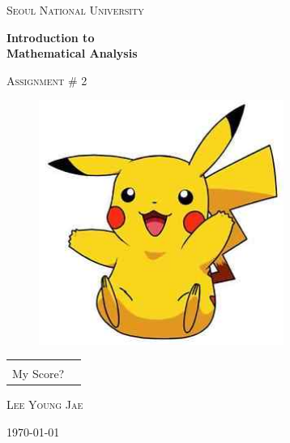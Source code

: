 \documentclass{article}
\begin{document}
\begin{titlepage}
\centering
{\scshape\LARGE Seoul National University \par}
\vspace{1.5cm}
{\huge\bfseries Introduction to\\Mathematical Analysis\par}
\vspace{1cm}
{\scshape\Large Assignment \# 2\par}

\vspace{1cm}

\begin{figure}[ht!]
\centering
\includegraphics[width=80mm]{pika.jpg}
\end{figure}

\vspace{1cm}

\arrayrulewidth=1.2pt
\begin{tabular}{p{2.5cm}p{2cm}}
\centering
& \\
\cline{2-2}
\vspace{-.73cm}
My Score? & \\
\end{tabular}



\vfill
{}
\vspace{.7cm}\par
\textsc{\large Lee Young Jae}
\vspace{.7cm}\par
{\Large \today\par}
\end{titlepage}

\setlength{\parindent}{0cm}
\end{document}

